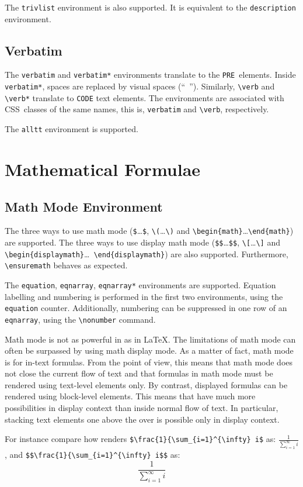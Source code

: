 The \verb+trivlist+ environment is also supported. It is equivalent to
the \verb+description+ environment.


\subsection{Verbatim}

The \verb+verbatim+ and \verb+verbatim*+ environments translate to
the \verb+PRE+~elements.  Inside \verb+verbatim*+, spaces are replaced
by visual spaces (``\verb*+ +'').  Similarly, \verb+\verb+
and \verb+\verb*+ translate to \verb+CODE+ text elements.  The
environments are associated with CSS~classes of the same names, this
is, \verb+verbatim+ and \verb+\verb+, respectively.

The \verb+alltt+ environment is supported.


\section{Mathematical Formulae}

\subsection{Math Mode Environment}
The three ways to use math mode (\verb+$+\ldots\verb+$+,
\verb+\(+\ldots\verb+\)+ and
\verb+\begin{math}+\ldots\verb+\end{math}+) are supported.
The three ways to use display math mode (\verb+$$+\ldots\verb+$$+,
\verb+\[+\ldots\verb+\]+ and
\verb+\begin{displaymath}+\ldots\ \verb+\end{displaymath}+) are also
supported.
Furthermore, \verb+\ensuremath+ behaves as expected.


The \verb+equation+, \verb+eqnarray+, \verb+eqnarray*+ environments
are supported.
Equation labelling and numbering is performed in the first two
environments, using the \verb+equation+ counter.
Additionally, numbering can be suppressed in one row of an
\verb+eqnarray+, using the \verb+\nonumber+ command.


Math mode is not as powerful in \hevea{} as in \LaTeX{}.  The
limitations of math mode can often be surpassed by using math display
mode.  As a matter of fact, math mode is for in-text formulas. From
the \html{} point of view, this means that math mode does not close
the current flow of text and that formulas in math mode must be
rendered using text-level elements only.  By contrast, displayed
formulas can be rendered using block-level elements.  This means that
\hevea{} have much more possibilities in display context than inside
normal flow of text.  In particular, stacking text elements one above
the over is possible only in display context.
\begin{htmlonly}
For instance compare how \hevea{} renders
\verb+$\frac{1}{\sum_{i=1}^{\infty} i$+
as: $\frac{1}{\sum_{i=1}^{\infty} i}$, and 
\verb+$$\frac{1}{\sum_{i=1}^{\infty} i$$+ as:
$$\frac{1}{\sum_{i=1}^{\infty} i}$$
\end{htmlonly}


